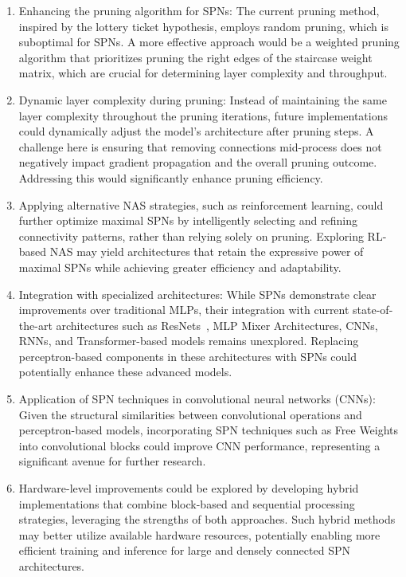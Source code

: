 \begin{enumerate}
    \item Enhancing the pruning algorithm for SPNs: The current pruning method, inspired by the lottery ticket hypothesis, employs random pruning, which is suboptimal for SPNs. A more effective approach would be a weighted pruning algorithm that prioritizes pruning the right edges of the staircase weight matrix, which are crucial for determining layer complexity and throughput.    
    \item Dynamic layer complexity during pruning: Instead of maintaining the same layer complexity throughout the pruning iterations, future implementations could dynamically adjust the model's architecture after pruning steps. A challenge here is ensuring that removing connections mid-process does not negatively impact gradient propagation and the overall pruning outcome. Addressing this would significantly enhance pruning efficiency.
    \item Applying alternative NAS strategies, such as reinforcement learning, could further optimize maximal SPNs by intelligently selecting and refining connectivity patterns, rather than relying solely on pruning. Exploring RL-based NAS may yield architectures that retain the expressive power of maximal SPNs while achieving greater efficiency and adaptability.
    \item Integration with specialized architectures: While SPNs demonstrate clear improvements over traditional MLPs, their integration with current state-of-the-art architectures such as ResNets~\cite{he2016deep}, MLP Mixer Architectures\cite{tolstikhin2021mlp}, CNNs\cite{krizhevsky2012imagenet}, RNNs\cite{lipton2015critical}, and Transformer-based models\cite{vaswani2017attention} remains unexplored. Replacing perceptron-based components in these architectures with SPNs could potentially enhance these advanced models.
    \item Application of SPN techniques in convolutional neural networks (CNNs): Given the structural similarities between convolutional operations and perceptron-based models, incorporating SPN techniques such as Free Weights into convolutional blocks could improve CNN performance, representing a significant avenue for further research.
    \item Hardware-level improvements could be explored by developing hybrid implementations that combine block-based and sequential processing strategies, leveraging the strengths of both approaches. Such hybrid methods may better utilize available hardware resources, potentially enabling more efficient training and inference for large and densely connected SPN architectures.
\end{enumerate}